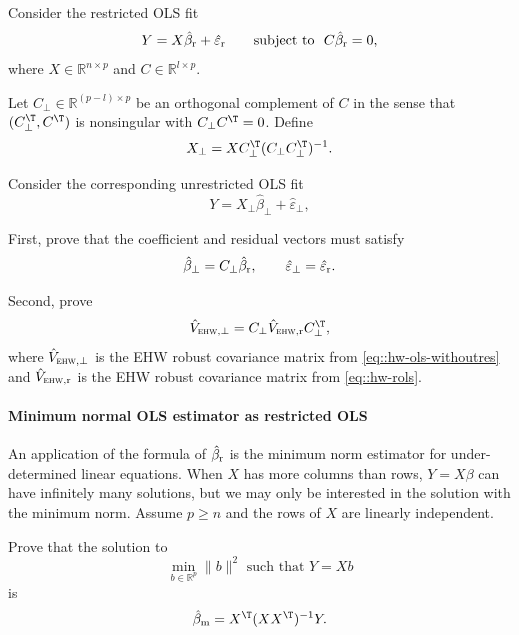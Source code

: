 Consider the restricted OLS fit 
\begin{equation}
\label{eq::hw-rols}
Y = X  \hat{\beta}_\textup{r} + \hat{\varepsilon}_\textup{r}   \qquad \text{subject to} \ \  C \hat{\beta}_\textup{r} = 0,
\end{equation}
where $X \in \mathbb R^{n\times p}$ and $C \in \mathbb R^{l \times p}$. 

Let $C_\perp \in \mathbb R^{(p-l) \times p}$ be an orthogonal complement of $C$ in the sense that $(C_\perp^{\T}, C^{\T})$ is nonsingular with $ C_\perp C^{\T} = 0$. Define 
$$
X_{\perp} = X  C_\perp^{\T} (C_\perp C_\perp^{\T})^{-1} .
$$

Consider the corresponding unrestricted OLS fit
\begin{equation}
\label{eq::hw-ols-withoutres}
Y =X_{\perp} \hat\beta_\perp  +  \hat{\varepsilon}_\perp , 
\end{equation}

First, prove that the coefficient and residual vectors must satisfy
$$
\hat\beta_\perp = C_\perp  \hat{\beta}_\textup{r}  , \qquad 
\hat{\varepsilon}_\perp = \hat{\varepsilon}_\textup{r}  . 
$$


Second, prove  
$$
\hat{V}_{\textsc{ehw}, \perp} =  C_\perp \hat{V}_{\textsc{ehw}, \textup{r}}  C_\perp^{\T} , 
$$
where $\hat{V}_{\textsc{ehw}, \perp} $ is the EHW robust covariance matrix from \eqref{eq::hw-ols-withoutres} and  $\hat{V}_{\textsc{ehw}, \textup{r}} $ is the EHW robust covariance matrix from \eqref{eq::hw-rols}. 




 


\paragraph{Minimum normal OLS estimator as restricted OLS}
\label{para::minimum-norm-rols}


An application of the formula of $\hat{\beta}_\textup{r} $ is the minimum norm estimator for under-determined linear equations. When $X$ has more columns than rows, $Y=X\beta$ can have infinitely many solutions, but we may only be interested in the solution with the minimum norm. Assume $p\geq n$ and the rows of $X$ are linearly independent. 

Prove that the solution to
$$
\min_{b\in \mathbb{R}^p} \| b\|^2 \text{ such that } Y = Xb
$$
is
$$
\hat{\beta}_\text{m} = X^{\T} (X X^{\T})^{-1} Y.
$$
 




